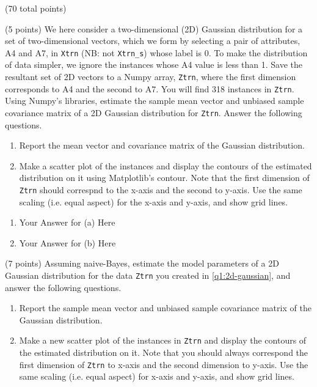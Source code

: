 \documentclass[12pt]{article}
\begin{document}
\begin{question}{(70 total points) \qOneTitle}
\begin{subquestion}{(5 points)
    We here consider a two-dimensional (2D) Gaussian distribution for
    a set of two-dimensional vectors, which we form by 
    selecting a pair of attributes, A4 and A7, in {\tt Xtrn} (NB: not {\tt Xtrn\_s}) whose label is 0.
    To make the distribution of data simpler, we ignore the instances whose A4 value is less than 1. 
    Save the resultant set of 2D vectors to a Numpy array, {\tt Ztrn}, where the first dimension corresponds to A4 and the second to A7.
    You will find 318 instances in {\tt Ztrn}.
  } \label{q1:2d-gaussian}
  Using Numpy's libraries, estimate the sample mean vector and unbiased sample covariance matrix of a 2D Gaussian distribution for {\tt Ztrn}. Answer the following questions.
  \begin{enumerate}\NARROWITEM
  \item Report the mean vector and covariance matrix of the Gaussian distribution.

  \item Make a scatter plot of the instances and display the contours of the estimated distribution on it using Matplotlib's contour.
    Note that the first dimension of {\tt Ztrn} should correspnd to the x-axis
    and the second to y-axis. Use the same scaling (i.e. equal aspect) for the x-axis and y-axis, and show grid lines.
  \end{enumerate}
   

  \begin{answerbox}{0.6\textheight}
    \begin{enumerate}
    \item Your Answer for (a) Here
    \item Your Answer for (b) Here
    \end{enumerate}
  \end{answerbox}
  


\end{subquestion}

\begin{subquestion}{(7 points)
    Assuming naive-Bayes, estimate the model parameters of a 2D Gaussian distribution for the data {\tt Ztrn} you created in \ref{q1:2d-gaussian}, and answer the following questions.
  } \label{q1:2d-gaussina:nv}
  \begin{enumerate}\NARROWITEM
  \item Report the sample mean vector and unbiased sample covariance matrix of the Gaussian distribution. 
  \item Make a new scatter plot of the instances in {\tt Ztrn} and display the contours of the estimated distribution on it.
    Note that you should always correspond the first dimension of {\tt Ztrn} to x-axis and the second dimension to y-axis. Use the same scaling (i.e. equal aspect) for x-axis and y-axis, and show grid lines.


\end{enumerate}
\end{subquestion}
\end{question}
\end{document}
